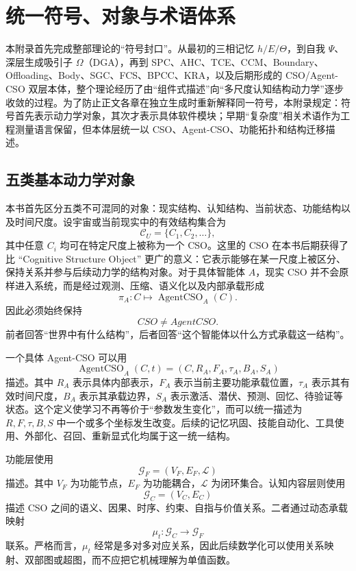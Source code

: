 \chapter{统一符号、对象与术语体系}
\label{app:symbols}

\begin{chapterlead}
本附录首先完成整部理论的“符号封口”。从最初的三相记忆 $h/E/\Theta$，到自我 $\Psi$、深层生成吸引子 $\Omega$（DGA），再到 SPC、AHC、TCE、CCM、Boundary、Offloading、Body、SGC、FCS、BPCC、KRA，以及后期形成的 CSO/Agent-CSO 双层本体，整个理论经历了由“组件式描述”向“多尺度认知结构动力学”逐步收敛的过程。为了防止正文各章在独立生成时重新解释同一符号，本附录规定：符号首先表示动力学对象，其次才表示具体软件模块；早期“复杂度”相关术语作为工程测量语言保留，但本体层统一以 CSO、Agent-CSO、功能拓扑和结构迁移描述。
\end{chapterlead}

\section{五类基本动力学对象}

本书首先区分五类不可混同的对象：现实结构、认知结构、当前状态、功能结构以及时间尺度。设宇宙或当前现实中的有效结构集合为
\[
\mathcal C_U=\{C_1,C_2,\ldots\},
\]
其中任意 $C_i$ 均可在特定尺度上被称为一个 CSO。这里的 CSO 在本书后期获得了比 ``Cognitive Structure Object'' 更广的意义：它表示能够在某一尺度上被区分、保持关系并参与后续动力学的结构对象。对于具体智能体 $A$，现实 CSO 并不会原样进入系统，而是经过观测、压缩、语义化以及内部承载形成
\[
\pi_A:C\mapsto \operatorname{AgentCSO}_A(C).
\]
因此必须始终保持
\[
CSO\neq AgentCSO.
\]
前者回答“世界中有什么结构”，后者回答“这个智能体以什么方式承载这一结构”。

一个具体 Agent-CSO 可以用
\[
\operatorname{AgentCSO}_A(C,t)
=
(C,R_A,F_A,\tau_A,B_A,S_A)
\]
描述。其中 $R_A$ 表示具体内部表示，$F_A$ 表示当前主要功能承载位置，$\tau_A$ 表示其有效时间尺度，$B_A$ 表示其承载边界，$S_A$ 表示激活、潜伏、预测、回忆、待验证等状态。这个定义使学习不再等价于“参数发生变化”，而可以统一描述为 $R,F,\tau,B,S$ 中一个或多个坐标发生改变。后续的记忆巩固、技能自动化、工具使用、外部化、召回、重新显式化均属于这一统一结构。

功能层使用
\[
\mathcal G_F=(V_F,E_F,\mathcal L)
\]
描述。其中 $V_F$ 为功能节点，$E_F$ 为功能耦合，$\mathcal L$ 为闭环集合。认知内容层则使用
\[
\mathcal G_C=(V_C,E_C)
\]
描述 CSO 之间的语义、因果、时序、约束、自指与价值关系。二者通过动态承载映射
\[
\mu_t:\mathcal G_C\rightarrow\mathcal G_F
\]
联系。严格而言，$\mu_t$ 经常是多对多对应关系，因此后续数学化可以使用关系映射、双部图或超图，而不应把它机械理解为单值函数。

